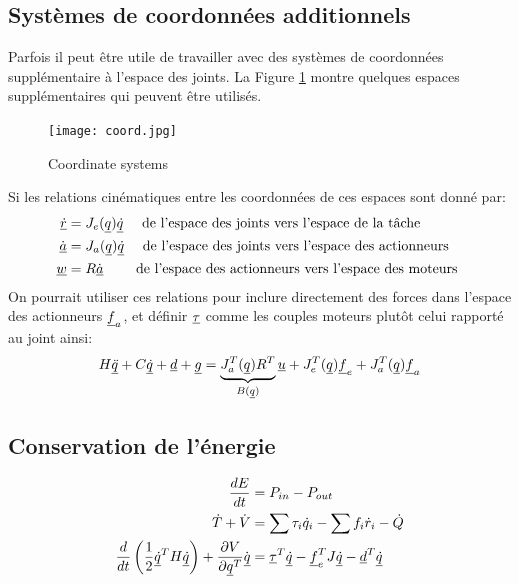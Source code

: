 \newpage
\subsection{Systèmes de coordonnées additionnels}
\label{sec:coord}

Parfois il peut être utile de travailler avec des systèmes de coordonnées supplémentaire à l'espace des joints. La Figure \ref{fig:coord} montre quelques espaces supplémentaires qui peuvent être utilisés. 
%
\begin{figure}[H]
	\centering
		\texttt{[image: coord.jpg]}
	\caption{Coordinate systems}%
	\label{fig:coord}
\end{figure}
%
Si les relations cinématiques entre les coordonnées de ces espaces sont donné par:
%
\begin{align}
\underline{\dot{r}}   &= J_e( \underline{q} ) \underline{\dot{q} }  \quad \text{ de l'espace des joints vers l'espace de la tâche   } \\
\underline{\dot{a}}   &= J_a( \underline{q} ) \underline{\dot{q} }  \quad \text{ de l'espace des joints vers l'espace des actionneurs } \\
\underline{w }        &= R              \underline{\dot{a} }  \quad\quad \text{ de l'espace des actionneurs vers l'espace des moteurs } 
\label{eq:coord_transform2}
\end{align}
%
%
On pourrait utiliser ces relations pour inclure directement des forces dans l'espace des actionneurs $\underline{f}_a$, et définir $\underline{\tau}$ comme les couples moteurs plutôt celui rapporté au joint ainsi:
\begin{align}
H \underline{\ddot{q}} + C \underline{\dot{q}} + \underline{d} + \underline{g} =  \underbrace{ J_a^T(\underline{q}) R^T }_{B(\underline{q})}  \underline{u} + J_e^T(\underline{q}) \underline{f}_e + J_a^T(\underline{q}) \underline{f}_a
\label{eq:manipulator_gen}
\end{align}


\newpage
\subsection{Conservation de l'énergie}

\begin{align}
\frac{dE}{dt}     &= P_{in} - P_{out} \\
\dot{T} + \dot{V}  &= \sum \tau_i \dot{q}_i  - \sum f_i \dot{r}_i - \dot{Q} \\
\frac{d}{dt}\left( \frac{1}{2} \underline{\dot{q}}^T H \underline{\dot{q}} \right) + \frac{\partial V}{\partial \underline{q}^T} \dot{\underline{q}} &= \underline{\tau}^T \underline{\dot{q}}  - \underline{f}_e^T J \underline{\dot{q}} - \underline{d}^T \underline{\dot{q}}
\end{align}

